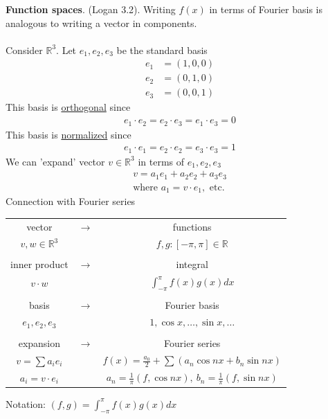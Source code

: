 \documentclass[12pt, letterpaper]{article}
\begin{document}
\textbf{Function spaces}. (Logan 3.2). Writing $f(x)$ in terms of Fourier basis is analogous
to writing a vector in components. \\ \\
 Consider $\mathbb{R}^3$. Let $e_1, e_2, e_3$ be the standard basis
\begin{align*}
    e_1 &= (1,0,0) \\
    e_2 &= (0,1,0) \\
    e_3 &= (0,0,1)
\end{align*}
This basis is \underline{orthogonal} since 
\begin{align*}
    e_1 \cdot e_2 = e_2 \cdot e_3 = e_1 \cdot e_3 = 0
\end{align*}
This basis is \underline{normalized} since 
\begin{align*}
    e_1 \cdot e_1 = e_2 \cdot e_2 = e_3 \cdot e_3 = 1
\end{align*}
We can 'expand' vector $v \in \mathbb{R}^3$ in terms of $e_1,e_2,e_3$
\begin{align*}
    v = a_1e_1 + a_2e_2 + a_3e_3 \\
    \text{where } a_1 = v\cdot e_1,\text{ etc.}
\end{align*}
Connection with Fourier series 
\begin{center}
    \begin{tabular}{c c c}
        vector & $\rightarrow$ & functions \\
        $v,w \in \mathbb{R}^3$ & & $f,g:[-\pi,\pi] \in \mathbb{R}$ \\ \\
        inner product & $\rightarrow$ & integral \\
        $v\cdot w$ & & $\int_{-\pi}^{\pi} f(x)g(x)dx$ \\ \\
       basis & $\rightarrow$ & Fourier basis \\
       $e_1,e_2,e_3$ & & $1,\cos x,\dots,\sin x,\dots$ \\ \\
       expansion & $\rightarrow$ & Fourier series \\
       $v = \sum a_i e_i$ & & $f(x) = \frac{a_0}{2} + \sum(a_n\cos nx + b_n \sin nx)$ \\
       $a_i = v\cdot e_i$ & & $a_n = \frac 1\pi(f,\cos nx),\ b_n = \frac 1\pi (f,\sin nx)$
    \end{tabular}
\end{center}
Notation: $(f,g) = \int_{-\pi}^{\pi}f(x)g(x)dx$ \\ \\ 
\end{document}

